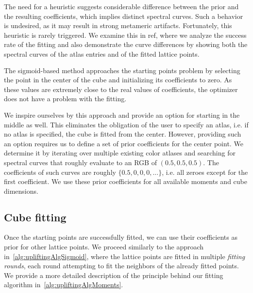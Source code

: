 The need for a heuristic suggests considerable difference between the prior and the resulting coefficients, which implies distinct spectral curves. Such a behavior is undesired, as it may result in strong metameric artifacts. Fortunately, this heuristic is rarely triggered. We examine this in ref, where we analyze the success rate of the fitting and also demonstrate the curve differences by showing both the spectral curves of the atlas entries and of the fitted lattice points.

The sigmoid-based method approaches the starting points problem by selecting the point in the center of the cube and initializing its coefficients to zero. As these values are extremely close to the real values of coefficients, the optimizer does not have a problem with the fitting.

We inspire ourselves by this approach and provide an option for starting in the middle as well. This eliminates the obligation of the user to specify an atlas, i.e. if no atlas is specified, the cube is fitted from the center. However, providing such an option requires us to define a set of prior coefficients for the center point. We determine it by iterating over multiple existing color atlases and searching for spectral curves that roughly evaluate to an RGB of $(0.5, 0.5, 0.5)$. The coefficients of such curves are roughly $\{0.5, 0, 0, 0, ... \}$, i.e. all zeroes except for the first coefficient. We use these prior coefficients for all available moments and cube dimensions.

\subsection{Cube fitting} \label{ssec:cubeFitting}
Once the starting points are successfully fitted, we can use their coefficients as prior for other lattice points. We proceed similarly to the approach in~\cref{alg:upliftingAlgSigmoid}, where the lattice points are fitted in multiple \emph{fitting rounds}, each round attempting to fit the neighbors of the already fitted points. We provide a more detailed description of the principle behind our fitting algorithm in~\cref{alg:upliftingAlgMoments}.

